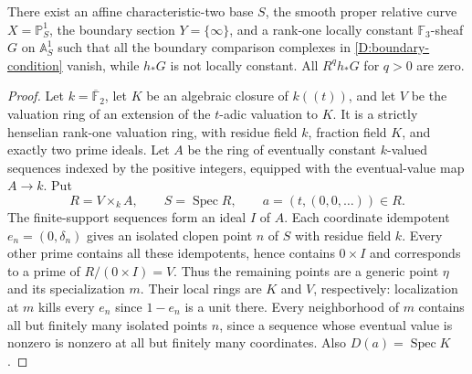 \begin{example}
\label{D:boundary-nonconstructible}
There exist an affine characteristic-two base $S$, the smooth proper
relative curve $X=\mathbb P^1_S$, the boundary section $Y=\{\infty\}$,
and a rank-one locally constant $\mathbb F_3$-sheaf $G$ on
$\mathbb A^1_S$ such that all the boundary comparison complexes in
\eqref{D:boundary-condition} vanish, while $h_*G$ is not locally
constant. All $R^q h_*G$ for $q>0$ are zero.
\end{example}
\begin{proof}
Let $k=\overline{\mathbb F}_2$, let $K$ be an algebraic closure of
$k((t))$, and let $V$ be the valuation ring of an extension of the
$t$-adic valuation to $K$. It is a strictly henselian rank-one
valuation ring, with residue field $k$, fraction field $K$, and
exactly two prime ideals. Let $A$ be the ring of eventually constant
$k$-valued sequences indexed by the positive integers, equipped with
the eventual-value map $A\to k$. Put
\[
 R=V\times_k A,\qquad S=\operatorname{Spec}R,
 \qquad a=(t,(0,0,\ldots))\in R.
\]
The finite-support sequences form an ideal $I$ of $A$. Each coordinate
idempotent $e_n=(0,\delta_n)$ gives an isolated clopen point $n$ of
$S$ with residue field $k$. Every other prime contains all these
idempotents, hence contains $0\times I$ and corresponds to a prime of
$R/(0\times I)=V$. Thus the remaining points are a generic point
$\eta$ and its specialization $m$. Their local rings are $K$ and
$V$, respectively: localization at $m$ kills every $e_n$ since
$1-e_n$ is a unit there. Every neighborhood of $m$ contains all but
finitely many isolated points $n$, since a sequence whose eventual
value is nonzero is nonzero at all but finitely many coordinates.
Also $D(a)=\operatorname{Spec}K$.


\end{proof}

